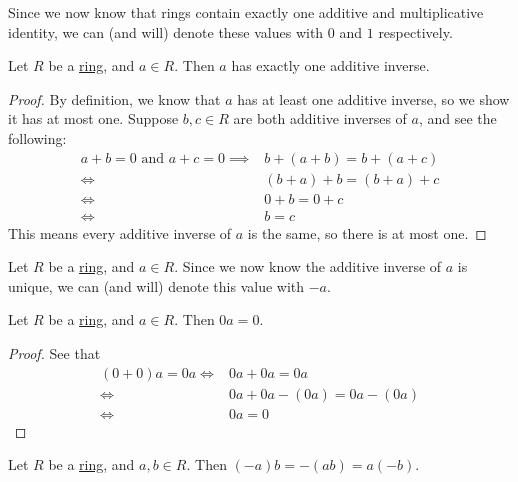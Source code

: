 \documentclass{scrartcl}
\begin{document}
Since we now know that rings contain exactly one additive and multiplicative identity, we can (and will) denote these
values with $0$ and $1$ respectively.

\begin{proposition}
    \label{prop:unique additive inverse}
    Let $R$ be a \hyperref[def:ring]{ring}, and $a\in R$.
    Then $a$ has exactly one additive inverse.
\end{proposition}

\begin{proof}
    By definition, we know that $a$ has at least one additive inverse, so we show it has at most one.
    Suppose $b,c\in R$ are both additive inverses of $a$, and see the following:
    \begin{align}
        a+b=0\text{ and }a+c=0
        \implies& b+(a+b)=b+(a+c) \\
        \iff& (b+a)+b=(b+a)+c \\
        \iff& 0+b=0+c \\
        \iff& b=c
    \end{align}
    This means every additive inverse of $a$ is the same, so there is at most one.
\end{proof}

Let $R$ be a \hyperref[def:ring]{ring}, and $a\in R$.
Since we now know the additive inverse of $a$ is unique, we can (and will) denote this value with $-a$.

\begin{proposition}
    \label{prop:multiply by zero}
    Let $R$ be a \hyperref[def:ring]{ring}, and $a\in R$.
    Then $0a=0$.
\end{proposition}

\begin{proof}
    See that
    \begin{align}
        (0+0)a=0a
        \iff& 0a+0a=0a \\
        \iff& 0a+0a-(0a)=0a-(0a) \\
        \iff& 0a=0
    \end{align}
\end{proof}

\begin{proposition}
    Let $R$ be a \hyperref[def:ring]{ring}, and $a,b\in R$.
    Then $(-a)b=-(ab)=a(-b)$.
\end{proposition}
\end{document}
